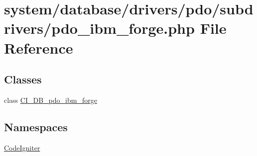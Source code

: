 \hypertarget{pdo__ibm__forge_8php}{}\section{system/database/drivers/pdo/subdrivers/pdo\+\_\+ibm\+\_\+forge.php File Reference}
\label{pdo__ibm__forge_8php}
\subsection*{Classes}
\begin{DoxyCompactItemize}
\item 
class \mbox{\hyperlink{class_c_i___d_b__pdo__ibm__forge}{C\+I\+\_\+\+D\+B\+\_\+pdo\+\_\+ibm\+\_\+forge}}
\end{DoxyCompactItemize}
\subsection*{Namespaces}
\begin{DoxyCompactItemize}
\item 
 \mbox{\hyperlink{namespace_code_igniter}{Code\+Igniter}}
\end{DoxyCompactItemize}
